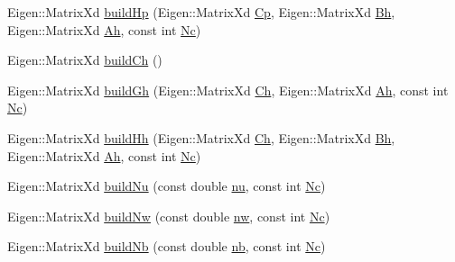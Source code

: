\begin{DoxyCompactItemize}
\item 
\-Eigen\-::\-Matrix\-Xd \hyperlink{classZmpPreviewController_a4c46593f53f695cb1df53a2af180f4a0}{build\-Hp} (\-Eigen\-::\-Matrix\-Xd \hyperlink{classZmpPreviewController_a1a63870dcc3d51a26c4adc9c97e650ff}{\-Cp}, \-Eigen\-::\-Matrix\-Xd \hyperlink{classZmpPreviewController_a98bd07d03d0a6004b345ef4310cf17b6}{\-Bh}, \-Eigen\-::\-Matrix\-Xd \hyperlink{classZmpPreviewController_a8ee8ec415e25374f4fa687f5a5a6b9df}{\-Ah}, const int \hyperlink{classZmpPreviewController_af0c8b4aa92a6e3e95f80d81a8c91f693}{\-Nc})
\item 
\-Eigen\-::\-Matrix\-Xd \hyperlink{classZmpPreviewController_a58723464a66fc3a1122c613500bb2052}{build\-Ch} ()
\item 
\-Eigen\-::\-Matrix\-Xd \hyperlink{classZmpPreviewController_ac0e73fabb20f31dbbb85ce61414dbb87}{build\-Gh} (\-Eigen\-::\-Matrix\-Xd \hyperlink{classZmpPreviewController_a2093754713ffb2a7adcd1310c73bf775}{\-Ch}, \-Eigen\-::\-Matrix\-Xd \hyperlink{classZmpPreviewController_a8ee8ec415e25374f4fa687f5a5a6b9df}{\-Ah}, const int \hyperlink{classZmpPreviewController_af0c8b4aa92a6e3e95f80d81a8c91f693}{\-Nc})
\item 
\-Eigen\-::\-Matrix\-Xd \hyperlink{classZmpPreviewController_ad6e2263a5d1990e0734537ec6c6c0136}{build\-Hh} (\-Eigen\-::\-Matrix\-Xd \hyperlink{classZmpPreviewController_a2093754713ffb2a7adcd1310c73bf775}{\-Ch}, \-Eigen\-::\-Matrix\-Xd \hyperlink{classZmpPreviewController_a98bd07d03d0a6004b345ef4310cf17b6}{\-Bh}, \-Eigen\-::\-Matrix\-Xd \hyperlink{classZmpPreviewController_a8ee8ec415e25374f4fa687f5a5a6b9df}{\-Ah}, const int \hyperlink{classZmpPreviewController_af0c8b4aa92a6e3e95f80d81a8c91f693}{\-Nc})
\item 
\-Eigen\-::\-Matrix\-Xd \hyperlink{classZmpPreviewController_ad1322ec975c7d022feb24a40fff62f2e}{build\-Nu} (const double \hyperlink{classZmpPreviewController_ac611f084023404faba1ccfab573cd81d}{nu}, const int \hyperlink{classZmpPreviewController_af0c8b4aa92a6e3e95f80d81a8c91f693}{\-Nc})
\item 
\-Eigen\-::\-Matrix\-Xd \hyperlink{classZmpPreviewController_a96bed83f8441cfbd6d6fbff54c5b530d}{build\-Nw} (const double \hyperlink{classZmpPreviewController_a783427b817d77469e1f80426bede5310}{nw}, const int \hyperlink{classZmpPreviewController_af0c8b4aa92a6e3e95f80d81a8c91f693}{\-Nc})
\item 
\-Eigen\-::\-Matrix\-Xd \hyperlink{classZmpPreviewController_ab4ab5756eb9faf991a12b405d116292f}{build\-Nb} (const double \hyperlink{classZmpPreviewController_a6716ee4c94e6f91e608ee1e29fbc7051}{nb}, const int \hyperlink{classZmpPreviewController_af0c8b4aa92a6e3e95f80d81a8c91f693}{\-Nc})
\end{DoxyCompactItemize}
